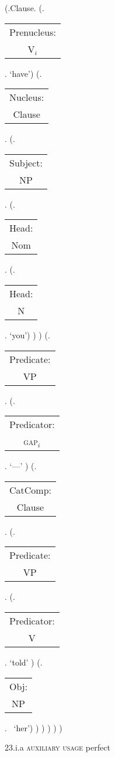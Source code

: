 \documentclass[12pt,letterpaper]{article}
\begin{document}
\begin{figure}
	\begin{center}
		\begin{parsetree}
			(.Clause.
			(.\begin{tabular}{c}Prenucleus:\\V$_i$\end{tabular}. `have')
			(.\begin{tabular}{c}Nucleus:\\Clause\end{tabular}.    
			(.\begin{tabular}{c}Subject:\\NP\end{tabular}.  
			(.\begin{tabular}{c}Head:\\Nom\end{tabular}.
			(.\begin{tabular}{c}Head:\\N\end{tabular}. `you')
			)
			)
			(.\begin{tabular}{c}Predicate:\\VP\end{tabular}.
			(.\begin{tabular}{c}Predicator:\\\textsc{gap}$_i$\end{tabular}.    `---' )
			(.\begin{tabular}{c}CatComp:\\Clause\end{tabular}.
			(.\begin{tabular}{c}Predicate:\\VP\end{tabular}.
			(.\begin{tabular}{c}Predicator:\\V\end{tabular}. `told' )
			(.\begin{tabular}{c}Obj:\\NP\end{tabular}.  ~`her')
			)
			)
			)
			)
			)
			
		\end{parsetree}
		\hfill \break \hfill \break
		23.i.a \textsc{auxiliary usage} perfect
	\end{center}
\end{figure}
\end{document}

